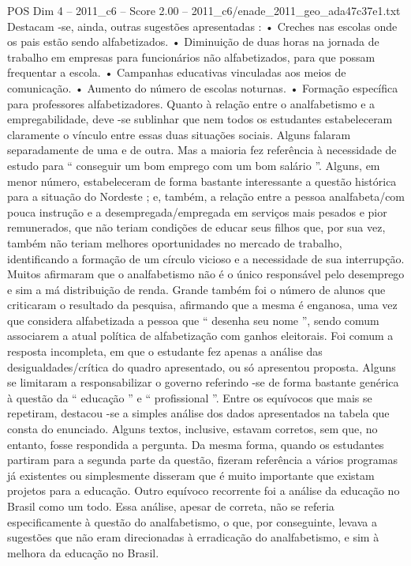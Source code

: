 \begin{textsample}{POS Dim 4 – 2011\_c6 – Score 2.00 – 2011\_c6/enade\_2011\_geo\_ada47c37e1.txt}
Destacam -se, ainda, outras sugestões apresentadas : • Creches nas escolas onde os pais estão sendo alfabetizados. • Diminuição de duas horas na jornada de trabalho em empresas para funcionários não alfabetizados, para que possam frequentar a escola. • Campanhas educativas vinculadas aos meios de comunicação. • Aumento do número de escolas noturnas. • Formação específica para professores alfabetizadores.
Quanto à relação entre o analfabetismo e a empregabilidade, deve -se sublinhar que nem todos os estudantes estabeleceram claramente o vínculo entre essas duas situações sociais.
Alguns falaram separadamente de uma e de outra.
Mas a maioria fez referência à necessidade de estudo para “ conseguir um bom emprego com um bom salário ”.
Alguns, em menor número, estabeleceram de forma bastante interessante a questão histórica para a situação do Nordeste ; e, também, a relação entre a pessoa analfabeta/com pouca instrução e a desempregada/empregada em serviços mais pesados e pior remunerados, que não teriam condições de educar seus filhos que, por sua vez, também não teriam melhores oportunidades no mercado de trabalho, identificando a formação de um círculo vicioso e a necessidade de sua interrupção.
Muitos afirmaram que o analfabetismo não é o único responsável pelo desemprego e sim a má distribuição de renda.
Grande também foi o número de alunos que criticaram o resultado da pesquisa, afirmando que a mesma é enganosa, uma vez que considera alfabetizada a pessoa que “ desenha seu nome ”, sendo comum associarem a atual política de alfabetização com ganhos eleitorais.
Foi comum a resposta incompleta, em que o estudante fez apenas a análise das desigualdades/crítica do quadro apresentado, ou só apresentou proposta.
Alguns se limitaram a responsabilizar o governo referindo -se de forma bastante genérica à questão da “ educação ” e “ profissional ”.
Entre os equívocos que mais se repetiram, destacou -se a simples análise dos dados apresentados na tabela que consta do enunciado.
Alguns textos, inclusive, estavam corretos, sem que, no entanto, fosse respondida a pergunta.
Da mesma forma, quando os estudantes partiram para a segunda parte da questão, fizeram referência a vários programas já existentes ou simplesmente disseram que é muito importante que existam projetos para a educação.
Outro equívoco recorrente foi a análise da educação no Brasil como um todo.
Essa análise, apesar de correta, não se referia especificamente à questão do analfabetismo, o que, por conseguinte, levava a sugestões que não eram direcionadas à erradicação do analfabetismo, e sim à melhora da educação no Brasil.

\end{textsample}

